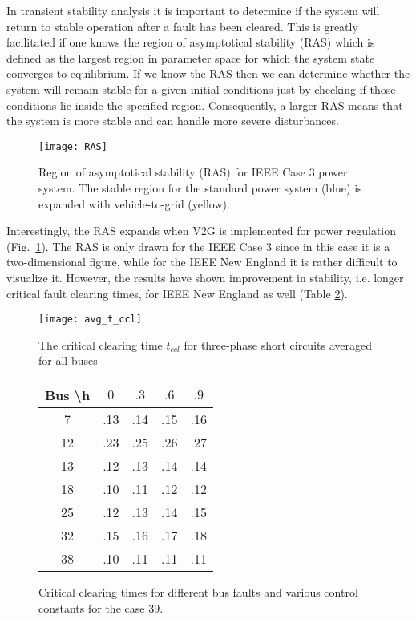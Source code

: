\documentclass[final,12pt]{elsarticle}
\begin{document}
In transient stability analysis it is important to determine if the system will
return to stable operation after a fault has been cleared. This is greatly
facilitated if one knows the region of asymptotical stability (RAS) which is
defined as the largest region in parameter space for which the system state
converges to equilibrium. If we know the RAS then we can determine whether the
system will remain stable for a given initial conditions just by checking if
those conditions lie inside the specified region.
Consequently, a larger RAS means that the system is more stable and can handle
more severe disturbances.

\begin{figure}[!htb]
\texttt{[image: RAS]}
\caption{Region of asymptotical stability (RAS) for IEEE Case 3 power system. The stable region for the standard power system (blue) is expanded with vehicle-to-grid (yellow).}
\label{fig:RAS}
\end{figure}

Interestingly, the RAS expands when V2G is implemented for power regulation
(Fig.~\ref{fig:RAS}). The RAS is only drawn for the IEEE Case 3 since in this
case it is a two-dimensional figure, while for the IEEE New England it is rather
difficult to visualize it. However, the results have shown improvement in
stability, i.e. longer critical fault clearing times, for IEEE New England as
well (Table \ref{tab:psse_t_ccl}).
\renewcommand{\arraystretch}{1.15}

\begin{figure}[!htb]
\CenterFloatBoxes
\begin{floatrow}
\ffigbox
  {\texttt{[image: avg\_t\_ccl]}}
  {\caption{The critical clearing time $t_{ccl}$ for three-phase short circuits averaged for all buses}\label{fig:psse_t_ccl}}
\killfloatstyle
\ttabbox
  {\begin{tabular}{ | c ||  c |  c |  c |  c | } 
 \hline 
Bus \textbackslash h & $0$ & $.3$ & $.6$ & $.9$  \\ \hline 
7 & .13 & .14 & .15 & .16    \\ \hline 
12 & .23 & .25 & .26 & .27   \\ \hline 
13 & .12 & .13 & .14 & .14    \\ \hline 
18 & .10 & .11 & .12 & .12    \\ \hline 
25 & .12 & .13 & .14 & .15    \\ \hline 
32 & .15 & .16 & .17 & .18    \\ \hline 
38 & .10 & .11 & .11 & .11    \\ \hline 
\end{tabular}
  }
  {\caption{Critical clearing times for different bus faults and various control constants for the case 39.}\label{tab:psse_t_ccl}}
\end{floatrow}
\end{figure}
\end{document}
